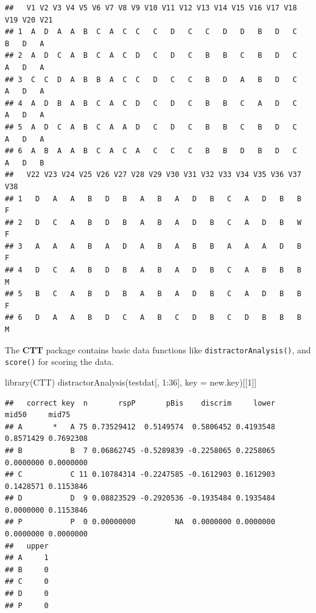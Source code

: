 \documentclass[
]{book}
\newenvironment{Shaded}{\begin{snugshade}}{\end{snugshade}}
\newcommand{\AttributeTok}[1]{\textcolor[rgb]{0.77,0.63,0.00}{#1}}
\newcommand{\DecValTok}[1]{\textcolor[rgb]{0.00,0.00,0.81}{#1}}
\newcommand{\FunctionTok}[1]{\textcolor[rgb]{0.00,0.00,0.00}{#1}}
\newcommand{\NormalTok}[1]{#1}
\newcommand{\SpecialCharTok}[1]{\textcolor[rgb]{0.00,0.00,0.00}{#1}}
\begin{document}
\begin{verbatim}
##   V1 V2 V3 V4 V5 V6 V7 V8 V9 V10 V11 V12 V13 V14 V15 V16 V17 V18 V19 V20 V21
## 1  A  D  A  A  B  C  A  C  C   C   D   C   C   D   D   B   D   C   B   D   A
## 2  A  D  C  A  B  C  A  C  D   C   D   C   B   B   C   B   D   C   A   D   A
## 3  C  C  D  A  B  B  A  C  C   D   C   C   B   D   A   B   D   C   A   D   A
## 4  A  D  B  A  B  C  A  C  D   C   D   C   B   B   C   A   D   C   A   D   A
## 5  A  D  C  A  B  C  A  A  D   C   D   C   B   B   C   B   D   C   A   D   A
## 6  A  B  A  A  B  C  A  C  A   C   C   C   B   B   D   B   D   C   A   D   B
##   V22 V23 V24 V25 V26 V27 V28 V29 V30 V31 V32 V33 V34 V35 V36 V37 V38
## 1   D   A   A   B   D   B   A   B   A   D   B   C   A   D   B   B   F
## 2   D   C   A   B   D   B   A   B   A   D   B   C   A   D   B   W   F
## 3   A   A   A   B   A   D   A   B   A   B   B   A   A   A   D   B   F
## 4   D   C   A   B   D   B   A   B   A   D   B   C   A   B   B   B   M
## 5   B   C   A   B   D   B   A   B   A   D   B   C   A   D   B   B   F
## 6   D   A   A   B   D   C   A   B   C   D   B   C   D   B   B   B   M
\end{verbatim}

The \textbf{CTT} package contains basic data functions like \texttt{distractorAnalysis()}, and \texttt{score()} for scoring the data.

\begin{Shaded}
\begin{Highlighting}[]
\FunctionTok{library}\NormalTok{(CTT)}
\FunctionTok{distractorAnalysis}\NormalTok{(testdat[, }\DecValTok{1}\SpecialCharTok{:}\DecValTok{36}\NormalTok{], }\AttributeTok{key =}\NormalTok{ new.key)[[}\DecValTok{1}\NormalTok{]]}
\end{Highlighting}
\end{Shaded}

\begin{verbatim}
##   correct key  n       rspP       pBis    discrim     lower     mid50     mid75
## A       *   A 75 0.73529412  0.5149574  0.5806452 0.4193548 0.8571429 0.7692308
## B           B  7 0.06862745 -0.5289839 -0.2258065 0.2258065 0.0000000 0.0000000
## C           C 11 0.10784314 -0.2247585 -0.1612903 0.1612903 0.1428571 0.1153846
## D           D  9 0.08823529 -0.2920536 -0.1935484 0.1935484 0.0000000 0.1153846
## P           P  0 0.00000000         NA  0.0000000 0.0000000 0.0000000 0.0000000
##   upper
## A     1
## B     0
## C     0
## D     0
## P     0
\end{verbatim}
\end{document}
